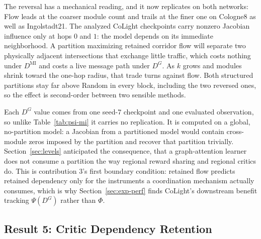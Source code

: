 \documentclass[journal]{IEEEtran}
\theoremstyle{definition}
\begin{document}
The reversal has a mechanical reading, and it now replicates on both networks: Flow leads at the coarser module count and trails at the finer one on Cologne8 as well as Ingolstadt21.
The analyzed CoLight checkpoints carry nonzero Jacobian influence only at hops $0$ and $1$: the model depends on its immediate neighborhood.
A partition maximizing retained corridor flow will separate two physically adjacent intersections that exchange little traffic, which costs nothing under $D^{\mathrm{MI}}$ and costs a live message path under $D^G$.
As $k$ grows and modules shrink toward the one-hop radius, that trade turns against flow.
Both structured partitions stay far above Random in every block, including the two reversed ones, so the effect is second-order between two sensible methods.

Each $D^G$ value comes from one seed-7 checkpoint and one evaluated observation, so unlike Table~\ref{tab:psi-mi} it carries no replication.
It is computed on a global, no-partition model: a Jacobian from a partitioned model would contain cross-module zeros imposed by the partition and recover that partition trivially.
Section~\ref{sec:levels} anticipated the consequence, that a graph-attention learner does not consume a partition the way regional reward sharing and regional critics do.
This is contribution 3's first boundary condition: retained flow predicts retained dependency only for the instruments a coordination mechanism actually consumes, which is why Section~\ref{sec:exp-perf} finds CoLight's downstream benefit tracking $\Psi(D^G)$ rather than $\Phi$.

\subsection{Result 5: Critic Dependency Retention}
\label{sec:exp-dq}
\end{document}

